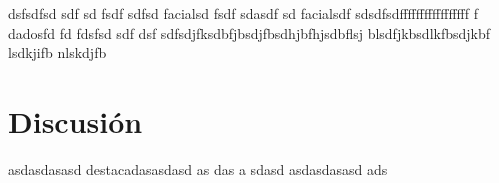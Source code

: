 \begin{table}[htpb]
    \centering
    \caption{Resumen de m\'etricas de concordancia entre anotadores.}
    \label{table:agreement_gpt}
\end{table}

dsfsdfsd sdf 
sd fsdf 
 sdfsd facialsd fsdf sdasdf
 sd facialsdf 
 sdsdfsdfffffffffffffffff f
  dadosfd
  fd fdsfsd sdf dsf sdfsdjfksdbfjbsdjfbsdhjbfhjsdbflsj blsdfjkbsdlkfbsdjkbf lsdkjifb nlskdjfb 
\section{Discusi\'on}

asdasdasasd
destacadasasdasd as das 
a sdasd asdasdasasd ads


